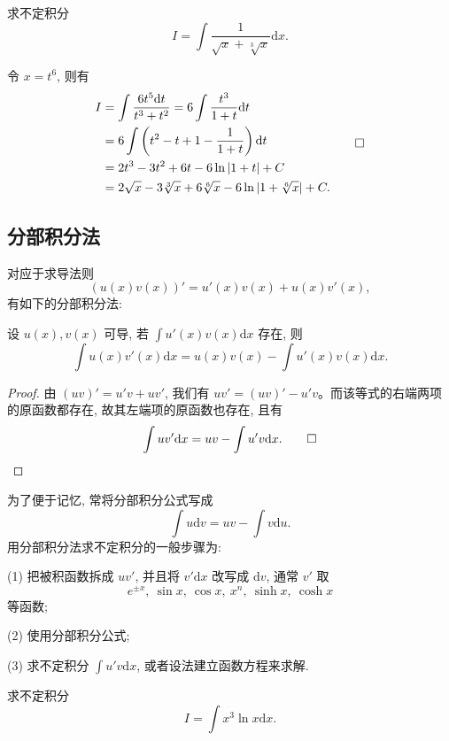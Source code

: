 \begin{example}\label{example:ma-6-2-17}
求不定积分
\[
  I=\int\frac1{\sqrt x+\sqrt[3]x}\mathrm dx.
\]
\end{example}


\begin{solve}
令 $x=t^6$, 则有
\[
\begin{aligned}
  I
  &=
  \int\frac{6t^5\mathrm dt}{t^3+t^2}
  =
  6\int\frac{t^3}{1+t}\mathrm dt\\
  &=
  6\int\left(t^2-t+1-\frac1{1+t}\right)\mathrm dt\\
  &=
  2t^3-3t^2+6t-6\ln|1+t|+C\\
  &=
  2\sqrt x-3\sqrt[3]x+6\sqrt[6]x-6\ln|1+\sqrt[6]x|+C.
\end{aligned}
\qedhere
\]
\end{solve}


\subsection{分部积分法}
\label{subsec:ma-6-2-3}

对应于求导法则
\[
  (u(x)v(x))'=u'(x)v(x)+u(x)v'(x),
\]
有如下的分部积分法:

\begin{theorem}\label{theorem:ma-6-2-3}
设 $u(x),v(x)$ 可导, 若 $\int u'(x)v(x)\mathrm dx$ 存在, 则
\[
  \int u(x)v'(x)\mathrm dx
  =
  u(x)v(x)-\int u'(x)v(x)\mathrm dx.
\]
\end{theorem}


\begin{proof}
由 $(uv)'=u'v+uv'$, 我们有 $uv'=(uv)'-u'v$。而该等式的右端两项的原函数都存在, 故其左端项的原函数也存在, 且有
\[
  \int uv'\mathrm dx=uv-\int u'v\mathrm dx.
\qedhere
\]
\end{proof}


\begin{remark}\label{remark:ma-6-source-59}
为了便于记忆, 常将分部积分公式写成
\[
  \int u\mathrm dv=uv-\int v\mathrm du.
\]
用分部积分法求不定积分的一般步骤为:

(1) 把被积函数拆成 $uv'$, 并且将 $v'\mathrm dx$ 改写成 $\mathrm dv$, 通常 $v'$ 取
\[
  e^{\pm x},\ \sin x,\ \cos x,\ x^n,\ \sinh x,\ \cosh x
\]
等函数;

(2) 使用分部积分公式;

(3) 求不定积分 $\int u'v\mathrm dx$, 或者设法建立函数方程来求解.
\end{remark}


\begin{example}\label{example:ma-6-2-18}
求不定积分
\[
  I=\int x^3\ln x\mathrm dx.
\]
\end{example}


